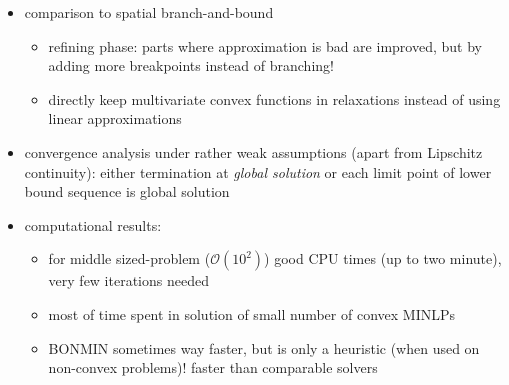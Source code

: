 \documentclass{article}
\begin{document}
\begin{itemize}
\item comparison to spatial branch-and-bound
	\begin{itemize}
	\item refining phase: parts where approximation is bad are improved, but by adding more breakpoints instead of branching!
	\item directly keep multivariate convex functions in relaxations instead of using linear approximations
	\end{itemize}
\item convergence analysis under rather weak assumptions (apart from Lipschitz continuity): either termination at \emph{global solution} or each limit point of lower bound sequence is global solution
\item computational results: 
	\begin{itemize}
	\item for middle sized-problem ($\mathcal{O}(10^2)$) good CPU times (up to two minute), very few iterations needed
	\item most of time spent in solution of small number of convex MINLPs
	\item BONMIN sometimes way faster, but is only a heuristic (when used on non-convex problems)! faster than comparable solvers
\end{itemize}	 
\end{itemize}
\end{document}
